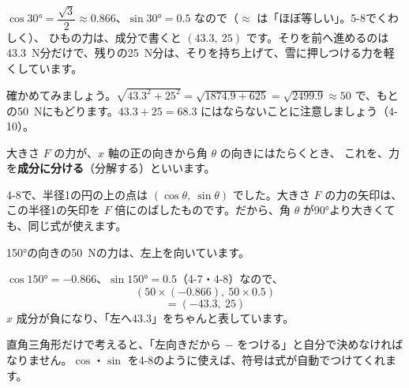\par\vspace{4pt}
$\cos30°=\dfrac{\sqrt3}{2}\approx0.866$、$\sin30°=0.5$ なので（$\approx$ は「ほぼ等しい」。5-8でくわしく）、
ひもの力は、成分で書くと $(43.3,\ 25)$ です。そりを前へ進めるのは\qty{43.3}{N}分だけで、残りの\qty{25}{N}分は、そりを持ち上げて、雪に押しつける力を軽くしています。

確かめてみましょう。$\sqrt{43.3^2+25^2}=\sqrt{1874.9+625}=\sqrt{2499.9}\approx50$ で、もとの\qty{50}{N}にもどります。$43.3+25=68.3$ にはならないことに注意しましょう（4-10）。

大きさ $F$ の力が、$x$ 軸の正の向きから角 $\theta$ の向きにはたらくとき、
これを、力を\textbf{成分に分ける}（分解する）といいます。

4-8で、半径1の円の上の点は $(\cos\theta,\ \sin\theta)$ でした。大きさ $F$ の力の矢印は、この半径1の矢印を $F$ 倍にのばしたものです。だから、角 $\theta$ が90°より大きくても、同じ式が使えます。

\noindent\begin{minipage}[c]{0.46\linewidth}\centering
{}
\end{minipage}\hfill
\begin{minipage}[c]{0.5\linewidth}\raggedright 
150°の向きの\qty{50}{N}の力は、左上を向いています。\par\vspace{2pt}
$\cos150°=-0.866$、$\sin150°=0.5$（4-7・4-8）なので、
\[ (50\times(-0.866),\ 50\times0.5) \]
\[ =(-43.3,\ 25) \]
$x$ 成分が負になり、「左へ43.3」をちゃんと表しています。
\end{minipage}

\par\vspace{4pt}
直角三角形だけで考えると、「左向きだから $-$ をつける」と自分で決めなければなりません。$\cos$・$\sin$ を4-8のように使えば、符号は式が自動でつけてくれます。

